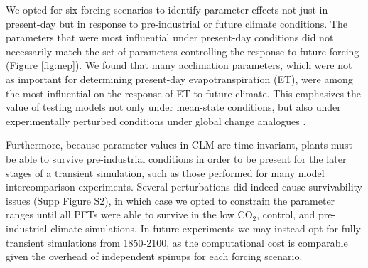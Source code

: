 \documentclass[draft]{agujournal2019}
\begin{document}
We opted for six forcing scenarios to identify parameter effects not just in present-day but in response to pre-industrial or future climate conditions. The parameters that were most influential under present-day conditions did not necessarily match the set of parameters controlling the response to future forcing (Figure \ref{fig:nep}). We found that many acclimation parameters, which were not as important for determining present-day evapotranspiration (ET), were among the most influential on the response of ET to future climate. This emphasizes the value of testing models not only under mean-state conditions, but also under experimentally perturbed conditions under global change analogues \cite{wieder2019}. 

Furthermore, because parameter values in CLM are time-invariant, plants must be able to survive pre-industrial conditions in order to be present for the later stages of a transient simulation, such as those performed for many model intercomparison experiments. Several perturbations did indeed cause survivability issues (Supp Figure S2), in which case we opted to constrain the parameter ranges until all PFTs were able to survive in the low CO$_2$, control, and pre-industrial climate simulations. In future experiments we may instead opt for fully transient simulations from 1850-2100, as the computational cost is comparable given the overhead of independent spinups for each forcing scenario.
\end{document}
